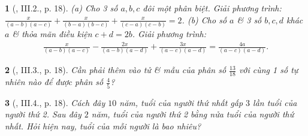 \documentclass{article}
\newtheorem{baitoan}{}
\begin{document}
\begin{baitoan}[\cite{SBT_Toan_8_tap_2}, III.2., p. 18]
	(a) Cho 3 số $a,b,c$ đôi một phân biệt. Giải phương trình: $\frac{x}{(a - b)(a - c)} + \frac{x}{(b - a)(b - c)} + \frac{x}{(c - a)(c - b)} = 2$. (b) Cho số $a$ \& 3 số $b,c,d$ khác $a$ \& thỏa mãn điều kiện $c + d = 2b$. Giải phương trình:
	\begin{align*}
		\frac{x}{(a - b)(a - c)} - \frac{2x}{(a - b)(a - d)} + \frac{3x}{(a - c)(a - d)} = \frac{4a}{(a - c)(a - d)}.
	\end{align*}
\end{baitoan}

\begin{baitoan}[\cite{SBT_Toan_8_tap_2}, III.3., p. 18]
	Cần phải thêm vào tử \& mẫu của phân số $\frac{13}{18}$ với cùng 1 số tự nhiên nào để được phân số $\frac{4}{5}$?
\end{baitoan}

\begin{baitoan}[\cite{SBT_Toan_8_tap_2}, III.4., p. 18]
	Cách đây $10$ năm, tuổi của người thứ nhất gấp $3$ lần tuổi của người thứ 2. Sau đây $2$ năm, tuổi của người thứ 2 bằng nửa tuổi của người thứ nhất. Hỏi hiện nay, tuổi của mỗi người là bao nhiêu?
\end{baitoan}


\printbibliography[heading=bibintoc]
	
\end{document}
